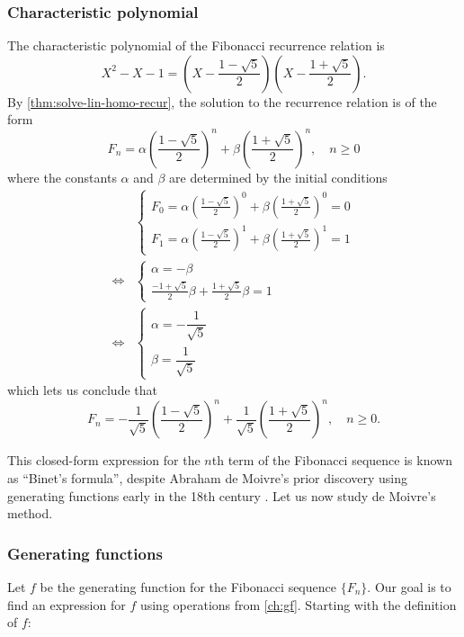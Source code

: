 \documentclass[a4paper, 12pt]{report}
\begin{document}
\subsubsection{Characteristic polynomial}
The characteristic polynomial of the Fibonacci recurrence relation is
\[X^2 - X - 1 = \left(X - \frac{1 - \sqrt{5}}{2}\right)
                \left(X - \frac{1 + \sqrt{5}}{2}\right).
\]
By \cref{thm:solve-lin-homo-recur}, the solution to the recurrence relation is of the form 
\[F_n = \alpha \left(\frac{1 - \sqrt{5}}{2}\right)^n + \beta \left(\frac{1 + \sqrt{5}}{2}\right)^n, \quad n \geq 0\]
where the constants $\alpha$ and $\beta$ are determined by the initial conditions
\begin{align*}
    &\begin{cases}
    F_0 = \alpha \left(\frac{1 - \sqrt{5}}{2}\right)^0 + \beta \left(\frac{1 + \sqrt{5}}{2}\right)^0 = 0\\
    F_1 = \alpha \left(\frac{1 - \sqrt{5}}{2}\right)^1 + \beta \left(\frac{1 + \sqrt{5}}{2}\right)^1 = 1
    \end{cases}\\
    \iff &\begin{cases}
    \alpha = -\beta\\
    \frac{-1 + \sqrt{5}}{2} \beta + \frac{1 + \sqrt{5}}{2} \beta = 1
    \end{cases}\tag{*}\label{eq:rec-constants}\\
    \iff &\begin{cases}
    \alpha = -\dfrac{1}{\sqrt{5}}\\
    \beta = \dfrac{1}{\sqrt{5}}
    \end{cases}
\end{align*}
which lets us conclude that
\[F_n = -\frac{1}{\sqrt{5}} \left(\frac{1 - \sqrt{5}}{2}\right)^n + \frac{1}{\sqrt{5}} \left(\frac{1 + \sqrt{5}}{2}\right)^n, \quad n \geq 0.\]

This closed-form expression for the $n$th term of the Fibonacci sequence is known as ``Binet's formula'', despite Abraham de Moivre's prior discovery using generating functions early in the 18th century \autocite[83]{knuth}. Let us now study de Moivre's method.

\subsubsection{Generating functions}
Let $f$ be the generating function for the Fibonacci sequence $\{F_n\}$. Our goal is to find an expression for $f$ using operations from \cref{ch:gf}. Starting with the definition of $f$:
\end{document}

